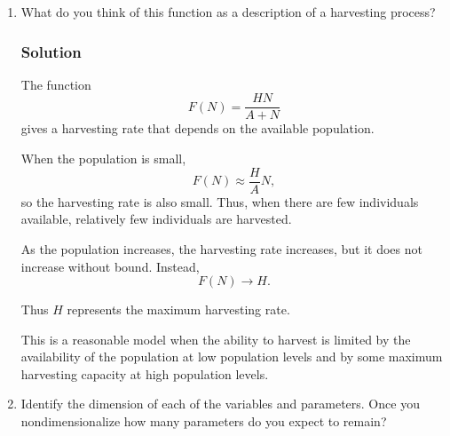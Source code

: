 \documentclass[12pt]{amsart}
\theoremstyle{conjecture}
\theoremstyle{definition}
\theoremstyle{question}
\theoremstyle{theorem}
\begin{document}
\begin{enumerate}[label=(\alph*)]
\begin{center}
        \end{center}

        The important qualitative features are therefore
        \[
            \boxed{
                F(0)=0,\qquad
                F(A)=\frac{H}{2},\qquad
                F(N)\to H
                \text{ as }N\to\infty.
            }
        \]

        \item
        What do you think of this function as a description of a harvesting
        process?

        \subsubsection*{Solution}

        The function
        \[
            F(N)=\frac{HN}{A+N}
        \]
        gives a harvesting rate that depends on the available population.

        When the population is small,
        \[
            F(N)\approx\frac{H}{A}N,
        \]
        so the harvesting rate is also small. Thus, when there are few
        individuals available, relatively few individuals are harvested.

        As the population increases, the harvesting rate increases, but it
        does not increase without bound. Instead,
        \[
            F(N)\to H.
        \]

        Thus \(H\) represents the maximum harvesting rate.

        This is a reasonable model when the ability to harvest is limited by
        the availability of the population at low population levels and by
        some maximum harvesting capacity at high population levels.

        \item
        Identify the dimension of each of the variables and parameters. Once
        you nondimensionalize how many parameters do you expect to remain?


\end{enumerate}
\end{document}
